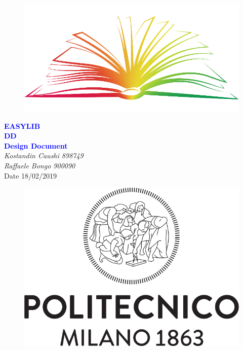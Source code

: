 


	\begin{titlepage}
		\centering
		\begin{figure}
			\vspace*{0mm}
			\centering
			\includegraphics[scale=0.3]{Images/EasyLib_Logo}
			\\[2cm]
		\end{figure}
		\vspace{5mm}
		\textcolor{Blue}{\textbf{\huge EASYLIB}}\\[15mm]
		\textcolor{Blue}{\textbf{\huge DD}}\\[4mm]
		{\textcolor{Blue}{\textbf{\Large{Design Document}}}}\\
		\vspace{30mm}
		\textit{\large Kostandin Caushi 898749}\\[3mm]
		\textit{\large Raffaele Bongo 900090}\\[3mm]
		\vspace*{30mm}
		Date 18/02/2019\\[1cm]
		\begin{figure}[h]
			\begin{flushright}
				\includegraphics[scale=0.13]{Images/Polimi_Logo}
			\end{flushright}
		\end{figure}
	\end{titlepage}

